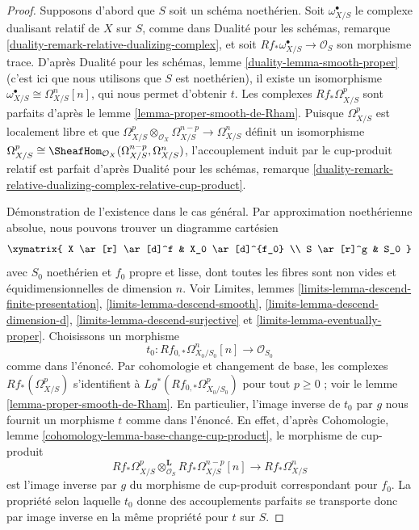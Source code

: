 \begin{proof}
Supposons d'abord que $S$ soit un schéma noethérien.
Soit $\omega^\bullet_{X/S}$ le complexe dualisant relatif de $X$ sur $S$, comme
dans Dualité pour les schémas, remarque \ref{duality-remark-relative-dualizing-complex},
et soit $Rf_*\omega_{X/S}^\bullet \to \mathcal{O}_S$ son morphisme trace. D'après
Dualité pour les schémas, lemme \ref{duality-lemma-smooth-proper}
(c'est ici que nous utilisons que $S$ est noethérien),
il existe un isomorphisme $\omega^\bullet_{X/S} \cong \Omega^n_{X/S}[n]$,
qui nous permet d'obtenir $t$. Les complexes $Rf_*\Omega^p_{X/S}$
sont parfaits d'après le lemme \ref{lemma-proper-smooth-de-Rham}.
Puisque $\Omega^p_{X/S}$ est localement libre et que
$\Omega^p_{X/S} \otimes_{\mathcal{O}_X} \Omega^{n - p}_{X/S} \to
\Omega^n_{X/S}$ définit un isomorphisme $\Omega^p_{X/S} \cong
\SheafHom_{\mathcal{O}_X}(\Omega^{n - p}_{X/S}, \Omega^n_{X/S})$,
l'accouplement induit par le cup-produit relatif est parfait d'après
Dualité pour les schémas, remarque
\ref{duality-remark-relative-dualizing-complex-relative-cup-product}.

\medskip\noindent
Démonstration de l'existence dans le cas général.
Par approximation noethérienne absolue, nous pouvons trouver un diagramme cartésien
$$
\xymatrix{
X \ar[r] \ar[d]^f & X_0 \ar[d]^{f_0} \\
S \ar[r]^g & S_0
}
$$
avec $S_0$ noethérien et $f_0$ propre et lisse,
dont toutes les fibres sont non vides et équidimensionnelles de dimension $n$.
Voir Limites, lemmes \ref{limits-lemma-descend-finite-presentation},
\ref{limits-lemma-descend-smooth}, \ref{limits-lemma-descend-dimension-d},
\ref{limits-lemma-descend-surjective} et
\ref{limits-lemma-eventually-proper}. Choisissons un morphisme
$$
t_0 : Rf_{0, *}\Omega^n_{X_0/S_0}[n] \longrightarrow \mathcal{O}_{S_0}
$$
comme dans l'énoncé. Par cohomologie et changement de base, les
complexes $Rf_*(\Omega^p_{X/S})$ s'identifient à
$Lg^*(Rf_{0, *}\Omega^p_{X_0/S_0})$ pour tout $p \geq 0$ ; voir
le lemme \ref{lemma-proper-smooth-de-Rham}. En particulier, l'image inverse
de $t_0$ par $g$ nous fournit un morphisme $t$ comme dans l'énoncé.
En effet, d'après Cohomologie, lemme \ref{cohomology-lemma-base-change-cup-product},
le morphisme de cup-produit
$$
Rf_*\Omega^p_{X/S}
\otimes_{\mathcal{O}_S}^\mathbf{L}
Rf_*\Omega^{n - p}_{X/S}[n]
\longrightarrow
Rf_*\Omega^n_{X/S}
$$
est l'image inverse par $g$ du morphisme de cup-produit correspondant pour $f_0$.
La propriété selon laquelle $t_0$ donne des accouplements parfaits se transporte donc par image inverse
en la même propriété pour $t$ sur $S$.


\end{proof}
